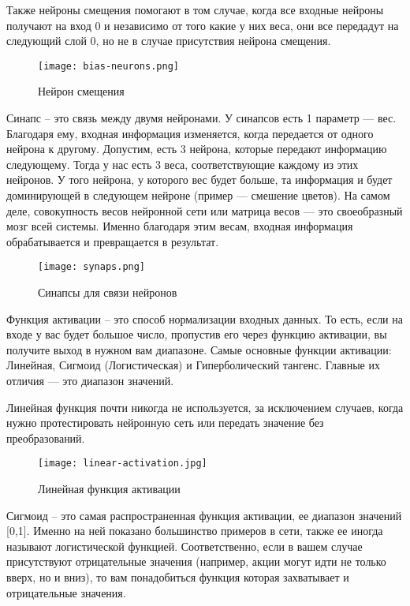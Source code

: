 Также нейроны смещения помогают в том случае, когда все входные нейроны получают на вход 0 и независимо от того какие
у них веса, они все передадут на следующий слой 0, но не в случае присутствия нейрона смещения.

\begin{figure}[!ht]
  \centering
  \texttt{[image: bias-neurons.png]}
  \caption{Нейрон смещения}
  \label{fig:analysis:bias-neurons}
\end{figure}

Синапс -- это связь между двумя нейронами. У синапсов есть 1 параметр — вес. Благодаря ему, входная информация изменяется,
когда передается от одного нейрона к другому. Допустим, есть 3 нейрона, которые передают информацию следующему.
Тогда у нас есть 3 веса, соответствующие каждому из этих нейронов. У того нейрона, у которого вес будет больше, та
информация и будет доминирующей в следующем нейроне (пример — смешение цветов). На самом деле, совокупность весов
нейронной сети или матрица весов — это своеобразный мозг всей системы. Именно благодаря этим весам, входная информация
обрабатывается и превращается в результат.

\begin{figure}[!ht]
  \centering
  \texttt{[image: synaps.png]}
  \caption{Синапсы для связи нейронов}
  \label{fig:analysis:synaps}
\end{figure}

Функция активации -- это способ нормализации входных данных. То есть, если на входе у
вас будет большое число, пропустив его через функцию активации, вы получите выход в нужном вам диапазоне. Самые
основные функции активации: Линейная, Сигмоид (Логистическая) и Гиперболический
тангенс. Главные их отличия — это диапазон значений.

Линейная функция почти никогда не используется, за исключением случаев, когда нужно протестировать нейронную сеть или
передать значение без преобразований.

\begin{figure}[!ht]
  \centering
  \texttt{[image: linear-activation.jpg]} 
  \caption{Линейная функция активации}
  \label{fig:analysis:linear-activation}
\end{figure}

Сигмоид -- это самая распространенная функция активации, ее диапазон значений [0,1]. Именно на ней показано большинство примеров
в сети, также ее иногда называют логистической функцией. Соответственно, если в вашем случае присутствуют отрицательные
значения (например, акции могут идти не только вверх, но и вниз), то вам понадобиться функция которая захватывает и
отрицательные значения.

